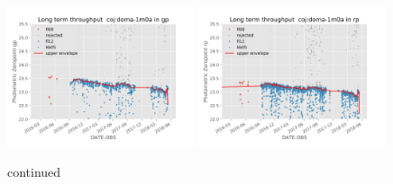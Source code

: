 \documentclass[]{spieman}
\begin{document}
\begin{figure}
\includegraphics[width=0.49\textwidth]{images/photzptrend-coj-doma-1m0a-gp.png} \hspace*{\fill}
\includegraphics[width=0.49\textwidth]{images/photzptrend-coj-doma-1m0a-rp.png} \\[1ex]
\caption {continued}
\end{figure}
\end{document}
